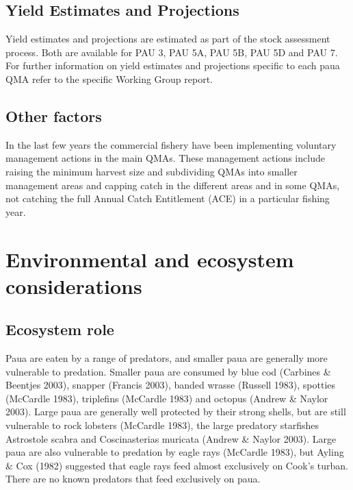 \documentclass{mpi-plenary}
\theoremstyle{definition}
\theoremstyle{definition}
\theoremstyle{definition}
\theoremstyle{remark}
\begin{document}
\subsection{Yield Estimates and
Projections}\label{yield-estimates-and-projections}

Yield estimates and projections are estimated as part of the stock
assessment process. Both are available for PAU 3, PAU 5A, PAU 5B, PAU 5D
and PAU 7. For further information on yield estimates and projections
specific to each paua QMA refer to the specific Working Group report.

\subsection{Other factors}\label{other-factors}

In the last few years the commercial fishery have been implementing
voluntary management actions in the main QMAs. These management actions
include raising the minimum harvest size and subdividing QMAs into
smaller management areas and capping catch in the different areas and in
some QMAs, not catching the full Annual Catch Entitlement (ACE) in a
particular fishing year.

\section{Environmental and ecosystem
considerations}\label{environmental-and-ecosystem-considerations}

\subsection{Ecosystem role}\label{ecosystem-role}

Paua are eaten by a range of predators, and smaller paua are generally
more vulnerable to predation. Smaller paua are consumed by blue cod
(Carbines \& Beentjes 2003), snapper (Francis 2003), banded wrasse
(Russell 1983), spotties (McCardle 1983), triplefins (McCardle 1983) and
octopus (Andrew \& Naylor 2003). Large paua are generally well protected
by their strong shells, but are still vulnerable to rock lobsters
(McCardle 1983), the large predatory starfishes Astrostole scabra and
Coscinasterias muricata (Andrew \& Naylor 2003). Large paua are also
vulnerable to predation by eagle rays (McCardle 1983), but Ayling \& Cox
(1982) suggested that eagle rays feed almost exclusively on Cook's
turban. There are no known predators that feed exclusively on paua.
\end{document}
